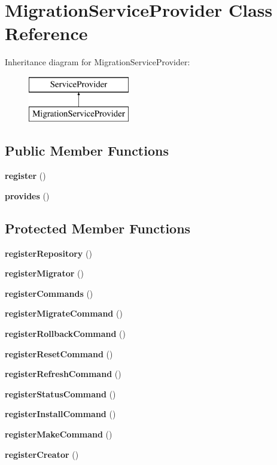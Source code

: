 \section{Migration\+Service\+Provider Class Reference}
\label{class_illuminate_1_1_database_1_1_migration_service_provider}
Inheritance diagram for Migration\+Service\+Provider\+:\begin{figure}[H]
\begin{center}
\leavevmode
\includegraphics[height=2.000000cm]{class_illuminate_1_1_database_1_1_migration_service_provider}
\end{center}
\end{figure}
\subsection*{Public Member Functions}
\begin{DoxyCompactItemize}
\item 
{\bf register} ()
\item 
{\bf provides} ()
\end{DoxyCompactItemize}
\subsection*{Protected Member Functions}
\begin{DoxyCompactItemize}
\item 
{\bf register\+Repository} ()
\item 
{\bf register\+Migrator} ()
\item 
{\bf register\+Commands} ()
\item 
{\bf register\+Migrate\+Command} ()
\item 
{\bf register\+Rollback\+Command} ()
\item 
{\bf register\+Reset\+Command} ()
\item 
{\bf register\+Refresh\+Command} ()
\item 
{\bf register\+Status\+Command} ()
\item 
{\bf register\+Install\+Command} ()
\item 
{\bf register\+Make\+Command} ()
\item 
{\bf register\+Creator} ()
\end{DoxyCompactItemize}

